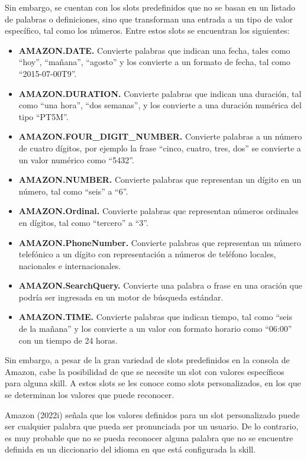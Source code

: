 Sin embargo, se cuentan con los slots predefinidos que no se basan en un listado de palabras o definiciones, sino que transforman una entrada a un tipo de valor específico, tal como los números. Entre estos slots se encuentran los siguientes:

\begin{itemize}
  \item \textbf{AMAZON.DATE.} Convierte palabras que indican una fecha, tales como “hoy”, “mañana”, “agosto” y los convierte a un formato de fecha, tal como “2015-07-00T9”.
  \item \textbf{AMAZON.DURATION.} Convierte palabras que indican una duración, tal como “una hora”, “dos semanas”, y los convierte a una duración numérica del tipo “PT5M”.
  \item \textbf{AMAZON.FOUR\_DIGIT\_NUMBER.} Convierte palabras a un número de cuatro dígitos, por ejemplo la frase “cinco, cuatro, tres, dos” se convierte a un valor numérico como “5432”.
  \item \textbf{AMAZON.NUMBER.} Convierte palabras que representan un dígito en un número, tal como “seis” a “6”.
  \item \textbf{AMAZON.Ordinal.} Convierte palabras que representan números ordinales en dígitos, tal como “tercero” a “3”.
  \item \textbf{AMAZON.PhoneNumber.} Convierte palabras que representan un número telefónico a un dígito con representación a números de teléfono locales, nacionales e internacionales.
  \item \textbf{AMAZON.SearchQuery.} Convierte una palabra o frase en una oración que podría ser ingresada en un motor de búsqueda estándar.
  \item \textbf{AMAZON.TIME.} Convierte palabras que indican tiempo, tal como “seis de la mañana” y los convierte a un valor con formato horario como “06:00” con un tiempo de 24 horas.
\end{itemize}

Sin embargo,  a pesar de la gran variedad de slots predefinidos en la consola de Amazon, cabe la posibilidad de que se necesite un slot con valores específicos para alguna skill. A estos slots se les conoce como slots personalizados, en los que se determinan los valores que puede reconocer.

Amazon (2022i) señala que los valores definidos para un slot personalizado puede ser cualquier palabra que pueda ser pronunciada por un usuario. De lo contrario, es muy probable que no se pueda reconocer alguna palabra que no se encuentre definida en un diccionario del idioma en que está configurada la skill.

